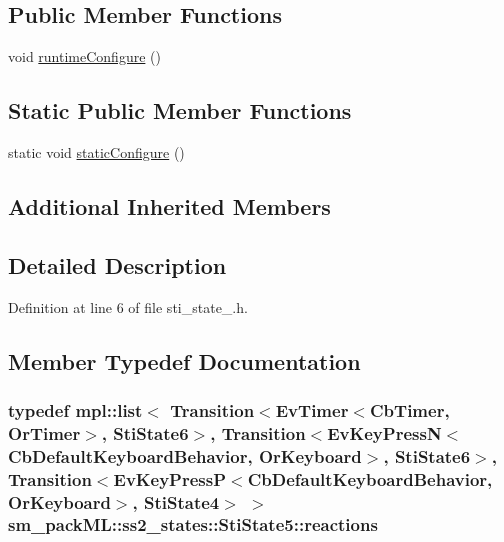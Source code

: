 \subsection*{Public Member Functions}
\begin{DoxyCompactItemize}
\item 
void \hyperlink{structsm__packML_1_1ss2__states_1_1StiState5_a5ec224516ec5b7a430082d1e49c58abf}{runtime\+Configure} ()
\end{DoxyCompactItemize}
\subsection*{Static Public Member Functions}
\begin{DoxyCompactItemize}
\item 
static void \hyperlink{structsm__packML_1_1ss2__states_1_1StiState5_a0bc39037f782bd19734236cdf9cac375}{static\+Configure} ()
\end{DoxyCompactItemize}
\subsection*{Additional Inherited Members}


\subsection{Detailed Description}


Definition at line 6 of file sti\+\_\+state\+\_.\+h.



\subsection{Member Typedef Documentation}
\subsubsection[{\texorpdfstring{reactions}{reactions}}]{\setlength{\rightskip}{0pt plus 5cm}typedef mpl\+::list$<$ Transition$<$Ev\+Timer$<$Cb\+Timer, {\bf Or\+Timer}$>$, {\bf Sti\+State6}$>$, Transition$<$Ev\+Key\+PressN$<$Cb\+Default\+Keyboard\+Behavior, {\bf Or\+Keyboard}$>$, {\bf Sti\+State6}$>$, Transition$<$Ev\+Key\+PressP$<$Cb\+Default\+Keyboard\+Behavior, {\bf Or\+Keyboard}$>$, {\bf Sti\+State4}$>$ $>$ {\bf sm\+\_\+pack\+M\+L\+::ss2\+\_\+states\+::\+Sti\+State5\+::reactions}}\hypertarget{structsm__packML_1_1ss2__states_1_1StiState5_a1e9fe3c799de348f5140e177f0a9200e}{}\label{structsm__packML_1_1ss2__states_1_1StiState5_a1e9fe3c799de348f5140e177f0a9200e}


